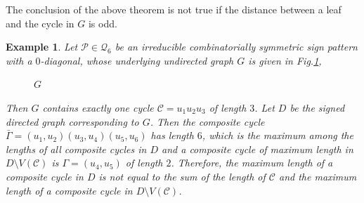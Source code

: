 \documentclass[a4paper, 10pt]{article}
\newtheorem{eg}{Example}[section]
\numberwithin{equation}{section}
\begin{document}
The conclusion of the above theorem is not true if the distance between a leaf and the cycle in $G$ is odd. 
\begin{eg}
	Let $\mathcal{P}\in \mathcal{Q}_6$ be an irreducible combinatorially symmetric sign pattern with a $0$-diagonal, whose underlying undirected graph $G$ is given in Fig.\ref{fig11.1},
	\begin{figure}[H]\label{fig11.1}
		\tikzset{node distance=1cm}
		\centering
		\caption{$G$}
	\end{figure} Then $G$ contains exactly one cycle $\mathcal{C}=u_1u_2u_3$ of length $3$. Let $D$ be the signed directed graph corresponding to $G$. Then the composite cycle $\bar{\Gamma} = (u_1, u_2)(u_3, u_4)(u_5, u_6)$ has length $6$, which is the maximum among the lengths of all composite cycles in $D$ and a composite cycle of maximum length in $D\setminus V(\mathcal{C})$ is $\Gamma=(u_4,u_5)$ of length $2$. Therefore, the maximum length of a composite cycle in $D$ is not equal to the sum of the length of $\mathcal{C}$ and the maximum length of a composite cycle in $D\setminus V(\mathcal{C})$.       
\end{eg}
\end{document}
